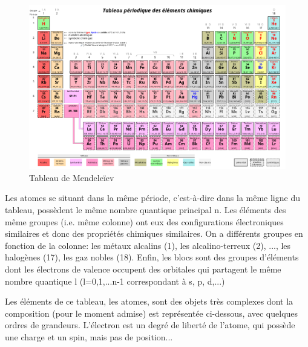 \begin{figure}[ht]
    \centering
    \includegraphics[scale=0.40]{Images1/mend.png}
    \caption{Tableau de Mendeleïev}
\end{figure}

Les atomes se situant dans la même période, c'est-à-dire dans la même ligne du tableau, possèdent le même nombre quantique principal n. Les éléments des même groupes (i.e. même colonne) ont eux des configurations électroniques similaires et donc des propriétés chimiques similaires. On a différents groupes en fonction de la colonne: les métaux alcalins (1), les alcalino-terreux (2), ..., les halogènes (17), les gaz nobles (18). Enfin, les blocs sont des groupes d'éléments dont les électrons de valence occupent des orbitales qui partagent le même nombre quantique l (l=0,1,...n-1 correspondant à s, p, d,...)

Les éléments de ce tableau, les atomes, sont des objets très complexes dont la composition (pour le moment admise) est représentée ci-dessous, avec quelques ordres de grandeurs. L'électron est un degré de liberté de l'atome, qui possède une charge et un spin, mais pas de position...

